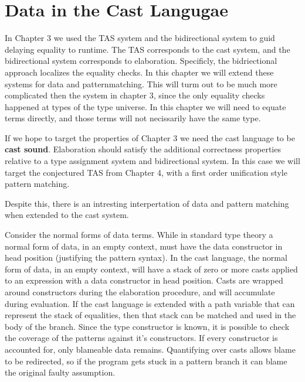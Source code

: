 \chapter{Data in the Cast Langugae}
\label{chapter:CastData}
\thispagestyle{myheadings}

In Chapter 3 we used the TAS system and the bidirectional system to guid delaying equality to runtime.
The TAS corresponds to the cast system, and the bidirectional system corresponds to elaboration.
Specificly, the bidriectional approach localizes the equality checks.
In this chapter we will extend these systems for data and patternmatching.
This will turm out to be much more complicated then the system in chapter 3, since the only equality checks happened at types of the type universe.
In this chapter we will need to equate terms directly, and those terms will not necissarily have the same type.

If we hope to target the properties of Chapter 3 we need the cast language to be \textbf{cast sound}. 
Elaboration should satisfy the additional correctness properties relative to a type assignment system and bidirectional system.
In this case we will target the conjectured TAS from Chapter 4, with a first order unification style pattern matching. 

Despite this, there is an intresting interpertation of data and pattern matching when extended to the cast system.

Consider the normal forms of data terms.
While in standard type theory a normal form of data, in an empty context, must have the data constructor in head position (justifying the pattern syntax).
In the cast language, the normal form of data, in an empty context, will have a stack of zero or more casts applied to an expression with a data constructor in head position.
Casts are wrapped around constructors during the elaboration procedure, and will accumulate during evaluation.
If the cast language is extended with a path variable that can represent the stack of equalities, then that stack can be matched and used in the body of the branch.
Since the type constructor is known, it is possible to check the coverage of the patterns against it's constructors.
If every constructor is accounted for, only blameable data remains.
Quantifying over casts allows blame to be redirected, so if the program gets stuck in a pattern branch it can blame the original faulty assumption.

